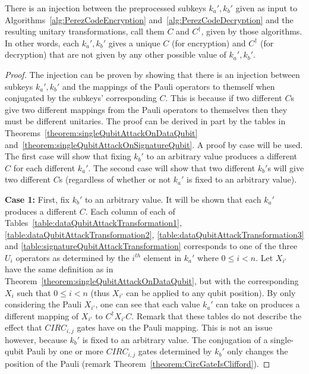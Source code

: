 \begin{theorem}
There is an injection between the preprocessed subkeys $k_a',k_b'$ given as input to Algorithms~\ref{alg:PerezCodeEncryption} and~\ref{alg:PerezCodeDecryption} and the resulting unitary transformations, call them $C$ and $C^{\dagger}$, given by those algorithms. In other words, each $k_a',k_b'$ gives a unique $C$ (for encryption) and $C^{\dagger}$ (for decryption) that are not given by any other possible value of  $k_a',k_b'$.
\end{theorem}
\begin{proof}
The injection can be proven by showing that there is an injection between subkeys $k_a',k_b'$ and the mappings of the Pauli operators to themself when conjugated by the subkeys' corresponding $C$. This is because if two different $C$s give two different mappings from the Pauli operators to themselves then they must be different unitaries. The proof can be derived in part by the tables in Theorems~\ref{theorem:singleQubitAttackOnDataQubit} and~\ref{theorem:singleQubitAttackOnSignatureQubit}. A proof by case will be used. The first case will show that fixing $k_b'$ to an arbitrary value produces a different $C$ for each different $k_a'$. The second case will show that two different $k_b'$s will give two different $C$s (regardless of whether or not $k_a'$ is fixed to an arbitrary value).

\textbf{Case 1:} First, fix $k_b'$ to an arbitrary value. It will be shown that each $k_a'$ produces a different $C$. Each column of each of Tables~\ref{table:dataQubitAttackTransformation1}, \ref{table:dataQubitAttackTransformation2}, \ref{table:dataQubitAttackTransformation3} and \ref{table:signatureQubitAttackTransformation} corresponds to one of the three $U_i$ operators as determined by the $i^{th}$ element in $k_a'$ where $0 \leq i < n$. Let $X_{i'}$ have the same definition as in Theorem~\ref{theorem:singleQubitAttackOnDataQubit}, but with the corresponding $X_i$ such that $0 \leq i < n$ (thus $X_{i'}$ can be applied to any qubit position). By only considering the Pauli $X_{i'}$, one can see that each value $k_a'$ can take on produces a different mapping of $X_{i'}$ to $C^{\dagger} X_{i'} C$. Remark that these tables do not describe the effect that $\mathit{CIRC}_{i,j}$ gates have on the Pauli mapping. This is not an issue however, because $k_b'$ is fixed to an arbitrary value. The conjugation of a single-qubit Pauli by one or more $\mathit{CIRC}_{i,j}$ gates determined by $k_b'$ only changes the position of the Pauli (remark Theorem~\ref{theorem:CircGateIsClifford}).


\end{proof}
